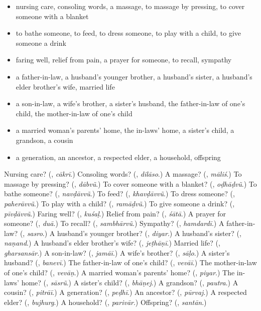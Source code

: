 \begin{itemize}
\raggedright
  \item nursing care, consoling words, a massage, to massage by pressing, to cover someone with a blanket
  \item to bathe someone, to feed, to dress someone, to play with a child, to give someone a drink
  \item faring well, relief from pain, a prayer for someone, to recall, sympathy
  \item a father-in-law, a husband's younger brother, a husband's sister, a husband's elder brother's wife, married life
  \item a son-in-law, a wife's brother, a sister's husband, the father-in-law of one's child, the mother-in-law of one's child
  \item a married woman's parents' home, the in-laws' home, a sister's child, a grandson, a cousin
  \item a generation, an ancestor, a respected elder, a household, offspring
\end{itemize}

\begin{tcolorbox}[breakable,colback=teal!4,colframe=teal!35!black,title={Before you move on}]
Nursing care? (\textbf{}, \emph{cākrī}.) Consoling words? (\textbf{}, \emph{dilāso}.) A massage? (\textbf{}, \emph{māliś}.) To massage by pressing? (\textbf{}, \emph{dābvũ}.) To cover someone with a blanket? (\textbf{}, \emph{oḍhāḍvũ}.) To bathe someone? (\textbf{}, \emph{navḍāvvũ}.) To feed? (\textbf{}, \emph{khavḍāvvũ}.) To dress someone? (\textbf{}, \emph{paherāvvũ}.) To play with a child? (\textbf{}, \emph{ramāḍvũ}.) To give someone a drink? (\textbf{}, \emph{pīvḍāvvũ}.) Faring well? (\textbf{}, \emph{kuśaḷ}.) Relief from pain? (\textbf{}, \emph{śātā}.) A prayer for someone? (\textbf{}, \emph{duā}.) To recall? (\textbf{}, \emph{sambhārvũ}.) Sympathy? (\textbf{}, \emph{hamdardī}.) A father-in-law? (\textbf{}, \emph{sasro}.) A husband's younger brother? (\textbf{}, \emph{diyar}.) A husband's sister? (\textbf{}, \emph{naṇand}.) A husband's elder brother's wife? (\textbf{}, \emph{jeṭhāṇī}.) Married life? (\textbf{}, \emph{gharsansār}.) A son-in-law? (\textbf{}, \emph{jamāī}.) A wife's brother? (\textbf{}, \emph{sāḷo}.) A sister's husband? (\textbf{}, \emph{banevī}.) The father-in-law of one's child? (\textbf{}, \emph{vevāī}.) The mother-in-law of one's child? (\textbf{}, \emph{vevāṇ}.) A married woman's parents' home? (\textbf{}, \emph{piyar}.) The in-laws' home? (\textbf{}, \emph{sāsrũ}.) A sister's child? (\textbf{}, \emph{bhāṇej}.) A grandson? (\textbf{}, \emph{pautra}.) A cousin? (\textbf{}, \emph{pitrāī}.) A generation? (\textbf{}, \emph{peḍhī}.) An ancestor? (\textbf{}, \emph{pūrvaj}.) A respected elder? (\textbf{}, \emph{bujhurg}.) A household? (\textbf{}, \emph{parivār}.) Offspring? (\textbf{}, \emph{santān}.)
\end{tcolorbox}
